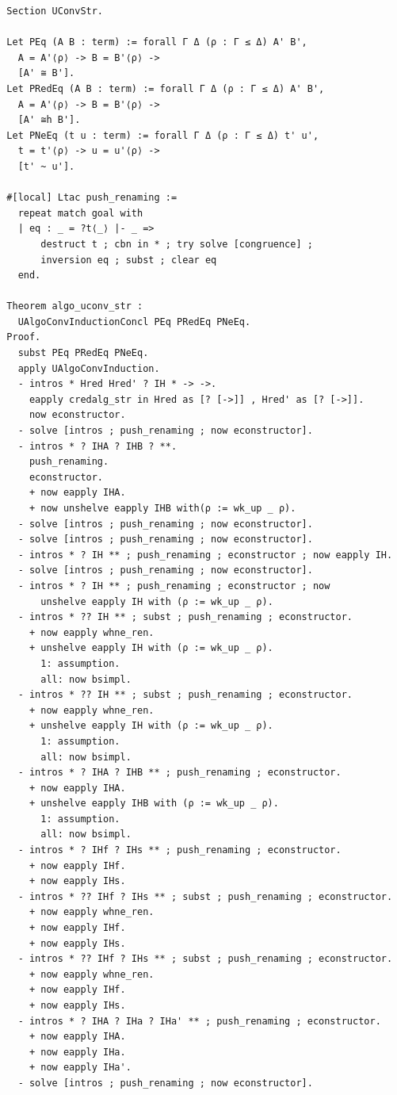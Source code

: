 \begin{lstlisting}
  Section UConvStr.
  
  Let PEq (A B : term) := forall Γ Δ (ρ : Γ ≤ Δ) A' B',
    A = A'⟨ρ⟩ -> B = B'⟨ρ⟩ ->
    [A' ≅ B'].
  Let PRedEq (A B : term) := forall Γ Δ (ρ : Γ ≤ Δ) A' B',
    A = A'⟨ρ⟩ -> B = B'⟨ρ⟩ ->
    [A' ≅h B'].
  Let PNeEq (t u : term) := forall Γ Δ (ρ : Γ ≤ Δ) t' u',
    t = t'⟨ρ⟩ -> u = u'⟨ρ⟩ ->
    [t' ~ u'].

  #[local] Ltac push_renaming :=
    repeat match goal with
    | eq : _ = ?t⟨_⟩ |- _ =>
        destruct t ; cbn in * ; try solve [congruence] ;
        inversion eq ; subst ; clear eq
    end.

  Theorem algo_uconv_str :
    UAlgoConvInductionConcl PEq PRedEq PNeEq.
  Proof.
    subst PEq PRedEq PNeEq.
    apply UAlgoConvInduction.
    - intros * Hred Hred' ? IH * -> ->.
      eapply credalg_str in Hred as [? [->]] , Hred' as [? [->]].
      now econstructor.
    - solve [intros ; push_renaming ; now econstructor].
    - intros * ? IHA ? IHB ? **.
      push_renaming.
      econstructor.
      + now eapply IHA.
      + now unshelve eapply IHB with(ρ := wk_up _ ρ).
    - solve [intros ; push_renaming ; now econstructor].
    - solve [intros ; push_renaming ; now econstructor].
    - intros * ? IH ** ; push_renaming ; econstructor ; now eapply IH.
    - solve [intros ; push_renaming ; now econstructor].
    - intros * ? IH ** ; push_renaming ; econstructor ; now
        unshelve eapply IH with (ρ := wk_up _ ρ).
    - intros * ?? IH ** ; subst ; push_renaming ; econstructor.
      + now eapply whne_ren.
      + unshelve eapply IH with (ρ := wk_up _ ρ).
        1: assumption.
        all: now bsimpl.
    - intros * ?? IH ** ; subst ; push_renaming ; econstructor.
      + now eapply whne_ren.
      + unshelve eapply IH with (ρ := wk_up _ ρ).
        1: assumption.
        all: now bsimpl.
    - intros * ? IHA ? IHB ** ; push_renaming ; econstructor.
      + now eapply IHA.
      + unshelve eapply IHB with (ρ := wk_up _ ρ).
        1: assumption.
        all: now bsimpl.
    - intros * ? IHf ? IHs ** ; push_renaming ; econstructor.
      + now eapply IHf.
      + now eapply IHs.
    - intros * ?? IHf ? IHs ** ; subst ; push_renaming ; econstructor.
      + now eapply whne_ren.
      + now eapply IHf.
      + now eapply IHs.
    - intros * ?? IHf ? IHs ** ; subst ; push_renaming ; econstructor.
      + now eapply whne_ren.
      + now eapply IHf.
      + now eapply IHs.
    - intros * ? IHA ? IHa ? IHa' ** ; push_renaming ; econstructor.
      + now eapply IHA.
      + now eapply IHa.
      + now eapply IHa'.
    - solve [intros ; push_renaming ; now econstructor].

\end{lstlisting}
